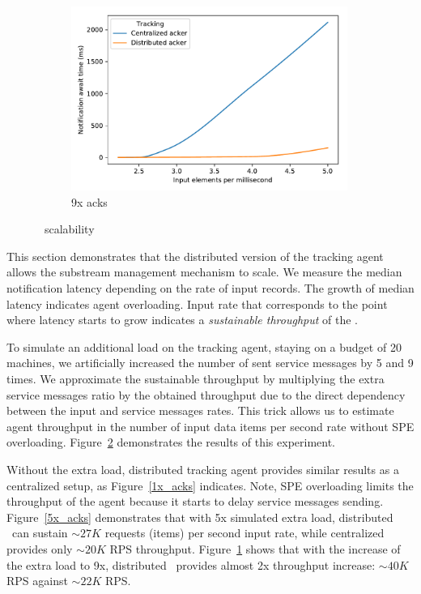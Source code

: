 \begin{figure}[t!]
    \begin{subfigure}[b]{0.32\textwidth}
            \includegraphics[width=0.99\textwidth]{pics/scalability_09x.pdf}
            \caption{9x acks}
            \label{9x_acks}
    \end{subfigure}
    \caption{\tracker\ scalability}
    \label{notification_scalability}
\end{figure}
This section demonstrates that the distributed version of the tracking agent allows the substream management mechanism to scale. We measure the median notification latency depending on the rate of input records. The growth of median latency indicates agent overloading. Input rate that corresponds to the point where latency starts to grow indicates a {\em sustainable throughput} of the \tracker. 

To simulate an additional load on the tracking agent, staying on a budget of 20 machines, we artificially increased the number of sent service messages by 5 and 9 times. We approximate the sustainable throughput by multiplying the extra service messages ratio by the obtained throughput due to the direct dependency between the input and service messages rates. This trick allows us to estimate agent throughput in the number of input data items per second rate without  SPE overloading. Figure~\ref{notification_scalability} demonstrates the results of this experiment.

Without the extra load, distributed tracking agent provides similar results as a centralized setup, as Figure~\ref{1x_acks} indicates. Note, SPE overloading limits the throughput of the agent because it starts to delay service messages sending. Figure~\ref{5x_acks} demonstrates that with 5x simulated extra load, distributed \tracker\ can sustain $\sim 27K$ requests (items) per second input rate, while centralized provides only $\sim 20K$ RPS throughput. Figure~\ref{9x_acks} shows that with the increase of the extra load to 9x, distributed \tracker\ provides almost 2x throughput increase: $\sim 40K$ RPS against $\sim 22K$ RPS. 

